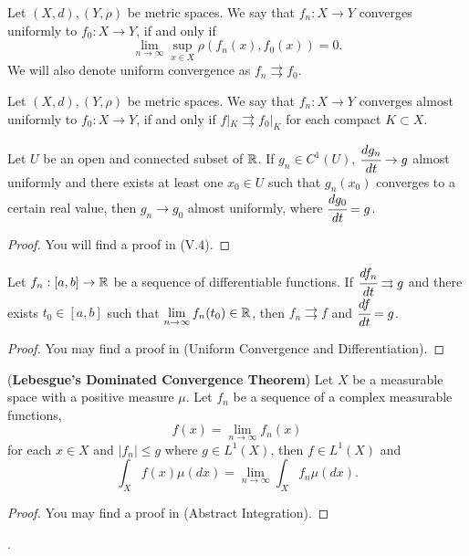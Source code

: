 \documentclass[main.tex]{subfiles}
\begin{document}
\begin{definition}
Let $(X, d), (Y, \rho)$ be metric spaces. We say that $f_n:X\to Y$ converges uniformly to $f_0:X\to Y$, if and only if
\begin{equation}
    \lim_{n\to\infty} \sup_{x\in X}\rho(f_n(x), f_0(x)) = 0.
\end{equation}
We will also denote uniform convergence as $f_n \rightrightarrows f_0.$
\end{definition}
\begin{definition}
Let $(X, d), (Y, \rho)$ be metric spaces. We say that $f_n:X\to Y$ converges almost uniformly to $f_0:X\to Y$, if and only if $f|_K \rightrightarrows f_0|_K$ for each compact $K\subset X$.
\end{definition}
\begin{theorem}
Let $U$ be an open and connected subset of $\mathbb{R}$. If $g_n\in C^1(U)$, $\cfrac{dg_n}{dt}\to g$ almost uniformly and there exists at least one $x_0\in U$ such that $g_n(x_0)$ converges to a certain real value, then $g_n\to g_0$ almost uniformly, where $\cfrac{dg_0}{dt} = g$.
\end{theorem}
\begin{proof}
You will find a proof in \cite{maurin1976} (V.4).
\end{proof}
\begin{theorem}
\label{diff_closed1}
Let $f_n:[a, b]\to \mathbb{R}$ be a sequence of differentiable functions. If  $\cfrac{df_n}{dt} \rightrightarrows g$
and there exists $t_0 \in [a, b]$ such that $\lim\limits_{n\to\infty}f_n(t_0)\in \mathbb{R}$, then $f_n \rightrightarrows f$ and $\cfrac{df}{dt} = g$.
\end{theorem}
\begin{proof}
You may find a proof in \cite{rudin1976} (Uniform Convergence and Differentiation).
\end{proof}
\begin{theorem}
\label{dominated_covergence}
(\textbf{Lebesgue's Dominated Convergence Theorem})
Let $X$ be a measurable space with a positive measure $\mu$. Let $f_n$ be a sequence of a complex measurable functions, $$f(x) = \lim_{n\to\infty} f_n(x)$$ for each $x\in X$ and $|f_n| \leq g$ where $g\in L^1(X)$, then $f\in L^1(X)$ and
\begin{equation}
    \int_X f(x) \mu(dx) = \lim_{n\to\infty} \int_X f_n \mu(dx).
\end{equation}
\end{theorem}
\begin{proof}
You may find a proof in \cite{rudin1987}  (Abstract Integration).
\end{proof}.
\end{document}
